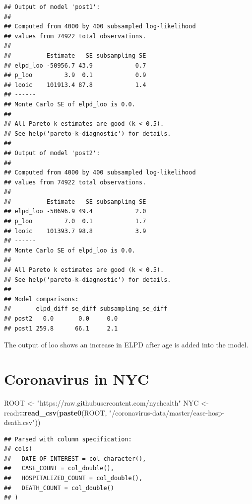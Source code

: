 \documentclass[]{article}
\newenvironment{Shaded}{\begin{snugshade}}{\end{snugshade}}
\newcommand{\DecValTok}[1]{\textcolor[rgb]{0.00,0.00,0.81}{#1}}
\newcommand{\KeywordTok}[1]{\textcolor[rgb]{0.13,0.29,0.53}{\textbf{#1}}}
\newcommand{\NormalTok}[1]{#1}
\newcommand{\OperatorTok}[1]{\textcolor[rgb]{0.81,0.36,0.00}{\textbf{#1}}}
\newcommand{\StringTok}[1]{\textcolor[rgb]{0.31,0.60,0.02}{#1}}
\begin{document}
\begin{verbatim}
## Output of model 'post1':
## 
## Computed from 4000 by 400 subsampled log-likelihood
## values from 74922 total observations.
## 
##          Estimate   SE subsampling SE
## elpd_loo -50956.7 43.9            0.7
## p_loo         3.9  0.1            0.9
## looic    101913.4 87.8            1.4
## ------
## Monte Carlo SE of elpd_loo is 0.0.
## 
## All Pareto k estimates are good (k < 0.5).
## See help('pareto-k-diagnostic') for details.
## 
## Output of model 'post2':
## 
## Computed from 4000 by 400 subsampled log-likelihood
## values from 74922 total observations.
## 
##          Estimate   SE subsampling SE
## elpd_loo -50696.9 49.4            2.0
## p_loo         7.0  0.1            1.7
## looic    101393.7 98.8            3.9
## ------
## Monte Carlo SE of elpd_loo is 0.0.
## 
## All Pareto k estimates are good (k < 0.5).
## See help('pareto-k-diagnostic') for details.
## 
## Model comparisons:
##       elpd_diff se_diff subsampling_se_diff
## post2   0.0       0.0     0.0              
## post1 259.8      66.1     2.1
\end{verbatim}

The output of loo shows an increase in ELPD after age is added into the
model.

\hypertarget{coronavirus-in-nyc}{%
\section{Coronavirus in NYC}\label{coronavirus-in-nyc}}

\begin{Shaded}
\begin{Highlighting}[]
\NormalTok{ROOT <-}\StringTok{ "https://raw.githubusercontent.com/nychealth"}
\NormalTok{NYC <-}\StringTok{ }\NormalTok{readr}\OperatorTok{::}\KeywordTok{read_csv}\NormalTok{(}\KeywordTok{paste0}\NormalTok{(ROOT, }\StringTok{"/coronavirus-data/master/case-hosp-death.csv"}\NormalTok{))}
\end{Highlighting}
\end{Shaded}

\begin{verbatim}
## Parsed with column specification:
## cols(
##   DATE_OF_INTEREST = col_character(),
##   CASE_COUNT = col_double(),
##   HOSPITALIZED_COUNT = col_double(),
##   DEATH_COUNT = col_double()
## )
\end{verbatim}

\begin{Shaded}
\end{Shaded}
\end{document}
